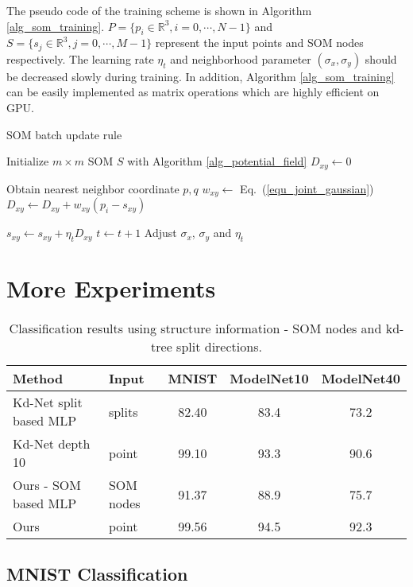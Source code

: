 \documentclass[10pt,twocolumn,letterpaper]{article}
\begin{document}
The pseudo code of the training scheme is shown in Algorithm \ref{alg_som_training}. $P=\{p_i\in\mathbb{R}^3, i=0, \cdots,N-1\}$ and $S=\{s_j\in\mathbb{R}^3, j=0, \cdots, M-1\}$ represent the input points and SOM nodes respectively. The learning rate $\eta_t$ and neighborhood parameter $(\sigma_x, \sigma_y)$ should be decreased slowly during training. In addition, Algorithm \ref{alg_som_training} can be easily implemented as matrix operations which are highly efficient on GPU.

\begin{algorithm}
\caption{SOM batch update rule} \label{alg_som_training}
\begin{algorithmic}
\State Initialize $m\times m $ SOM $S$ with Algorithm \ref{alg_potential_field}
    \State {}
        \State $D_{xy} \gets 0$
    \EndFor
    
    \State {}
        \State Obtain nearest neighbor coordinate $p, q$
            \State $w_{xy} \gets $ Eq.~(\ref{equ_joint_gaussian})
            \State $D_{xy} \gets D_{xy} + w_{xy}(p_i - s_{xy})$
        \EndFor
    \EndFor
    
    \State {}
        \State $s_{xy} \gets s_{xy} + \eta_t D_{xy}$
    \EndFor
    \State $t \gets t+1$
    \State Adjust $\sigma_x$, $\sigma_y$ and $\eta_t$
\EndFor
\end{algorithmic}
\end{algorithm}\section{More Experiments}\label{sec_more_exps}\begin{table*}[th]
\centering
\begin{tabular}{ll|ccc}
\hline
Method                                            & Input     & MNIST & ModelNet10 & ModelNet40 \\ \hline
Kd-Net split based MLP \cite{klokov2017escape}    & splits    & 82.40  & 83.4       & 73.2       \\
Kd-Net depth 10 \cite{klokov2017escape}           & point     & 99.10  & 93.3       & 90.6       \\ \hline
Ours - SOM based MLP                              & SOM nodes & 91.37  & 88.9       & 75.7       \\
Ours                                              & point     & 99.56  & 94.5       & 92.3       \\ \hline
\end{tabular}
\caption{Classification results using structure information - SOM nodes and kd-tree split directions. } \label{tbl_som_cls}
\end{table*}\subsection{MNIST Classification} 
\end{document}
